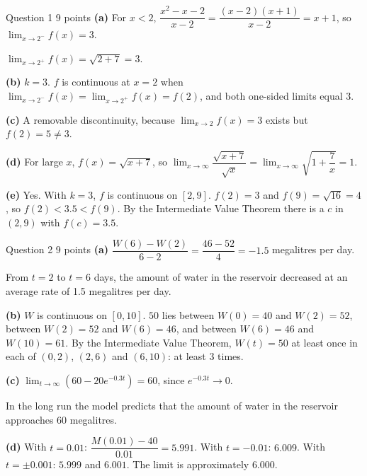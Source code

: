 \documentclass[11pt]{article}
\begin{document}

\begin{scorebox}{Question 1 \textperiodcentered{} 9 points}
\textbf{(a)} For $x<2$, $\dfrac{x^2-x-2}{x-2}=\dfrac{(x-2)(x+1)}{x-2}=x+1$, so $\displaystyle\lim_{x\to 2^-}f(x)=3$. 

$\displaystyle\lim_{x\to 2^+}f(x)=\sqrt{2+7}=3$. 

\medskip\textbf{(b)} $k=3$. $f$ is continuous at $x=2$ when $\displaystyle\lim_{x\to 2^-}f(x)=\displaystyle\lim_{x\to 2^+}f(x)=f(2)$, and both one-sided limits equal 3. 

\medskip\textbf{(c)} A removable discontinuity, because $\displaystyle\lim_{x\to 2}f(x)=3$ exists but $f(2)=5\neq3$. 

\medskip\textbf{(d)} For large $x$, $f(x)=\sqrt{x+7}$, so $\displaystyle\lim_{x\to \infty}\dfrac{\sqrt{x+7}}{\sqrt x}=\displaystyle\lim_{x\to \infty}\sqrt{1+\dfrac7x}=1$. 

\medskip\textbf{(e)} Yes. With $k=3$, $f$ is continuous on $[2,9]$. $f(2)=3$ and $f(9)=\sqrt{16}=4$, so $f(2)<3.5<f(9)$. By the Intermediate Value Theorem there is a $c$ in $(2,9)$ with $f(c)=3.5$. 
\end{scorebox}

\begin{scorebox}{Question 2 \textperiodcentered{} 9 points}
\textbf{(a)} $\dfrac{W(6)-W(2)}{6-2}=\dfrac{46-52}{4}=-1.5$ megalitres per day. 

From $t=2$ to $t=6$ days, the amount of water in the reservoir decreased at an average rate of 1.5 megalitres per day. 

\medskip\textbf{(b)} $W$ is continuous on $[0,10]$. $50$ lies between $W(0)=40$ and $W(2)=52$, between $W(2)=52$ and $W(6)=46$, and between $W(6)=46$ and $W(10)=61$. By the Intermediate Value Theorem, $W(t)=50$ at least once in each of $(0,2)$, $(2,6)$ and $(6,10)$: at least $3$ times. 

\medskip\textbf{(c)} $\displaystyle\lim_{t\to \infty}\left(60-20e^{-0.3t}\right)=60$, since $e^{-0.3t}\to0$. 

In the long run the model predicts that the amount of water in the reservoir approaches 60 megalitres. 

\medskip\textbf{(d)} With $t=0.01$: $\dfrac{M(0.01)-40}{0.01}=5.991$. With $t=-0.01$: $6.009$. With $t=\pm0.001$: $5.999$ and $6.001$. The limit is approximately $6.000$. 
\end{scorebox}
\end{document}
